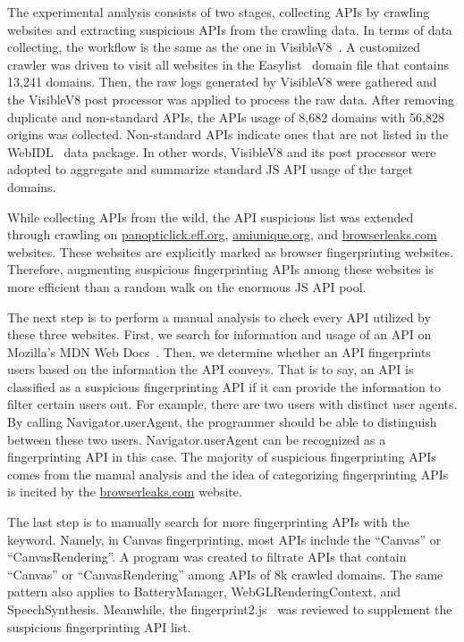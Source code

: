 The experimental analysis consists of two stages, collecting APIs by crawling websites and extracting suspicious APIs from the crawling data. In terms of data collecting, the workflow is the same as the one in VisibleV8~\cite{vv8-imc19}. A customized crawler was driven to visit all websites in the Easylist~\cite{Easylist} domain file that contains 13,241 domains. Then, the raw logs generated by VisibleV8 were gathered and the VisibleV8 post processor was applied to process the raw data. After removing duplicate and non-standard APIs, the APIs usage of 8,682 domains with 56,828 origins was collected. Non-standard APIs indicate ones that are not listed in the WebIDL~\cite{webidl} data package. In other words, VisibleV8 and its post processor were adopted to aggregate and summarize standard JS API usage of the target domains.

While collecting APIs from the wild, the API suspicious list was extended through crawling on \url{panopticlick.eff.org}, \url{amiunique.org}, and \url{browserleaks.com} websites. These websites are explicitly marked as browser fingerprinting websites. Therefore, augmenting suspicious fingerprinting APIs among these websites is more efficient than a random walk on the enormous JS API pool.

The next step is to perform a manual analysis to check every API utilized by these three websites. First, we search for information and usage of an API on Mozilla's MDN Web Docs~\cite{mdnwebdocs}. Then, we determine whether an API fingerprints users based on the information the API conveys. That is to say, an API is classified as a suspicious fingerprinting API if it can provide the information to filter certain users out. For example, there are two users with distinct user agents. By calling Navigator.userAgent, the programmer should be able to distinguish between these two users. Navigator.userAgent can be recognized as a fingerprinting API in this case. The majority of suspicious fingerprinting APIs comes from the manual analysis and the idea of categorizing fingerprinting APIs is incited by the \url{browserleaks.com} website. 

The last step is to manually search for more fingerprinting APIs with the keyword. Namely, in Canvas fingerprinting, most APIs include the ``Canvas'' or ``CanvasRendering''. A program was created to filtrate APIs that contain ``Canvas'' or ``CanvasRendering'' among APIs of 8k crawled domains. The same pattern also applies to BatteryManager, WebGLRenderingContext, and SpeechSynthesis. Meanwhile, the fingerprint2.js~\cite{fingerprintjs2020Oct} was reviewed to supplement the suspicious fingerprinting API list.  

